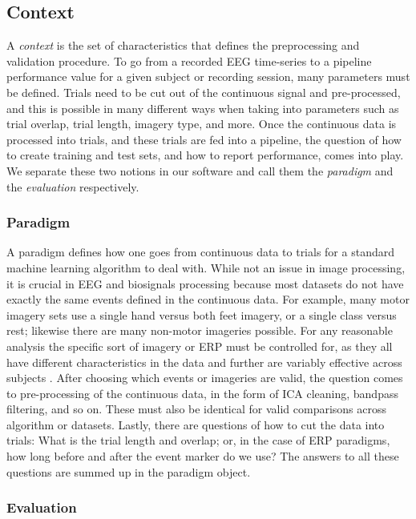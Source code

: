\subsection{Context}

A \emph{context} is the set of characteristics that defines the
preprocessing and validation procedure. To go from a recorded EEG
time-series to a pipeline performance value for a given subject or
recording session, many parameters must be defined. Trials need to be
cut out of the continuous signal and pre-processed, and this is
possible in many different ways when taking into parameters such as
trial overlap, trial length, imagery type, and more. Once the
continuous data is processed into trials, and these trials are fed
into a pipeline, the question of how to create training and test sets,
and how to report performance, comes into play. We separate these two
notions in our software and call them the \emph{paradigm} and the
\emph{evaluation} respectively.

\subsubsection{Paradigm}

A paradigm defines how one goes from continuous data to trials for a
standard machine learning algorithm to deal with. While not an issue
in image processing, it is crucial in EEG and biosignals processing
because most datasets do not have exactly the same events defined in
the continuous data. For example, many motor imagery sets use a single
hand versus both feet imagery, or a single class versus rest; likewise
there are many non-motor imageries possible. For any reasonable
analysis the specific sort of imagery or ERP must be controlled for,
as they all have different characteristics in the data and further are
variably effective across subjects \cite{Scherer2015,Allison2010}. After choosing
which events or imageries are valid, the question comes to
pre-processing of the continuous data, in the form of ICA cleaning,
bandpass filtering, and so on. These must also be identical for valid
comparisons across algorithm or datasets. Lastly, there are questions
of how to cut the data into trials: What is the trial length and
overlap; or, in the case of ERP paradigms, how long before and after
the event marker do we use? The answers to all these questions are
summed up in the paradigm object.

\subsubsection{Evaluation}

